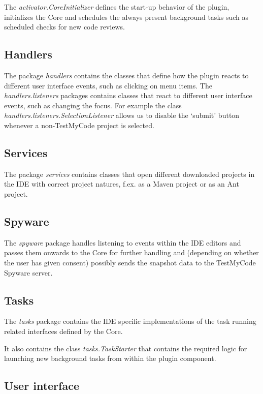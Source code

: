 \documentclass[12pt,a4paper,english,leqno]{article}
\begin{document}
The \textit{activator.CoreInitializer} defines the start-up behavior of the plugin, initializes the Core and schedules the always present background tasks such as scheduled checks for new code reviews.

\subsection{Handlers}

The package \textit{handlers} contains the classes that define how the plugin reacts to different user interface events, such as clicking on menu items. The \textit{handlers.listeners} packages contains classes that react to different user interface events, such as changing the focus. For example the class \textit{handlers.listeners.SelectionListener} allows us to disable the `submit' button whenever a non-TestMyCode project is selected.

\subsection{Services}

The package \textit{services} contains classes that open different downloaded projects in the IDE with correct project natures, f.ex. as a Maven project or as an Ant project.

\subsection{Spyware}

The \textit{spyware} package handles listening to events within the IDE editors and passes them onwards to the Core for further handling and (depending on whether the user has given consent) possibly sends the snapshot data to the TestMyCode Spyware server.

\subsection{Tasks}

The \textit{tasks} package contains the IDE specific implementations of the task running related interfaces defined by the Core.

It also contains the class \textit{tasks.TaskStarter} that contains the required logic for launching new background tasks from within the plugin component.

\subsection{User interface}
\end{document}
